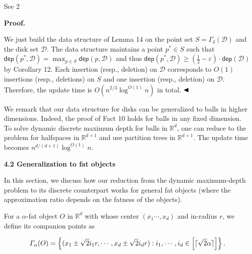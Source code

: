\documentclass[10pt,a4paper]{article}
\begin{document}
See 2
\par
\par
\par\medskip\noindent\textbf{Proof.}\par
We just build the data structure of Lemma 14 on the point set $S=\varGamma_{\delta}(\mathcal{D})$ and the disk set $\mathcal{D}$. The data structure maintains a point $p^{*}\in S$ such that $\mathsf{dep}(p^{*},\mathcal{D})=\max_{p\in S}\mathsf{dep}(p,\mathcal{D})$ and thus $\mathsf{dep}(p^{*},\mathcal{D})\geq(\frac{1}{2}-\varepsilon)\cdot\mathsf{dep}(%
\mathcal{D})$ by Corollary 12. Each insertion (resp., deletion) on $\mathcal{D}$ corresponds to $O(1)$ insertions (resp., deletions) on $S$ and one insertion (resp., deletion) on $\mathcal{D}$. Therefore, the update time is $O(n^{2/3}\log^{O(1)}{n})$ in total. $\hfill\blacktriangleleft$
\par
\par
We remark that our data structure for disks can be generalized to balls in higher dimensions. Indeed, the proof of Fact 10 holds for balls in any fixed dimension. To solve dynamic discrete maximum depth for balls in $\mathbb{R}^{d}$, one can reduce to the problem for halfspaces in $\mathbb{R}^{d+1}$ and use partition trees in $\mathbb{R}^{d+1}$. The update time becomes $n^{d/(d+1)}\log^{O(1)}n$.
\par
\par
\par\medskip\noindent\textbf{4.2 Generalization to fat objects}\par
In this section, we discuss how our reduction from the dynamic maximum-depth problem to its discrete counterpart works for general fat objects (where the approximation ratio depends on the fatness of the objects).
\par
\par
For a $\alpha$-fat object $O$ in $\mathbb{R}^{d}$ with whose center $(x_{1}\cdots,x_{d})$ and in-radius $r$, we define its companion points as
\par
\[\begin{aligned}
\varGamma_{\alpha}(O)=\left\{(x_{1}\pm\sqrt{2}i_{1}r,\cdots,x_{d}\pm\sqrt{2}i_%
{d}r):i_{1},\cdots,i_{d}\in\left[\lceil\sqrt{2}\alpha\rceil\right]\right\}.
\end{aligned}\]
\end{document}
